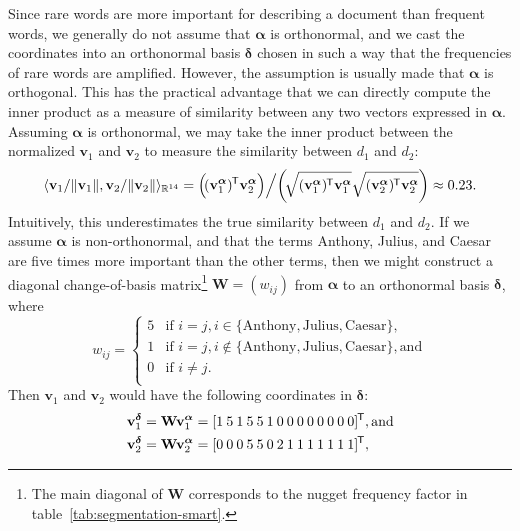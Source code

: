 \documentclass[
  digital, %
  notable, %
  lof,     %
  lot,     %
  nopalatino, color
]{fithesis3}
\newcommand*{\tran}{^{\mkern-1.5mu\mathsf{T}}}
\let\note=\footnote
\begin{document}
Since rare words are more important for describing a document than frequent
words, we generally do not assume that $\bm\alpha$ is orthonormal, and we
cast the coordinates into an orthonormal basis $\bm\delta$
chosen in such a way that the frequencies of rare words are amplified. However,
the assumption is usually made that $\bm\alpha$ is orthogonal. This has the
practical advantage that we can directly compute the inner product as a measure
of similarity between any two vectors expressed in $\bm\alpha$. Assuming
$\bm\alpha$ is orthonormal, we may take the inner product between the
normalized $\mathbf v_1$ and $\mathbf v_2$ to measure the similarity between
$d_1$ and $d_2$:
\begin{equation*}
  \langle\mathbf v_1/\Vert \mathbf v_1\Vert, \mathbf v_2/\Vert\mathbf
  v_2\Vert\rangle_{\mathbb{R}^{14}} = \Big(\!(\mathbf v_1^{\bm\alpha})\tran \mathbf v_2^{\bm\alpha}\Big) \Big/ \!
  \left(\!\sqrt{\mathbf (\mathbf v_1^{\bm\alpha})\tran \mathbf
  v_1^{\bm\alpha}}\sqrt{\mathbf (\mathbf v_2^{\bm\alpha})\tran \mathbf
  v_2^{\bm\alpha}}\right)\approx0.23.
\end{equation*}
Intuitively, this underestimates the true similarity between $d_1$ and $d_2$.
If we assume $\bm\alpha$ is non-orthonormal, and that the terms Anthony, Julius, and
Caesar are five times more important than the other terms, then we might construct
a diagonal change-of-basis matrix\note{%
The main diagonal of $\mathbf W$ corresponds to the
nugget frequency factor in table~\ref{tab:segmentation-smart}.} $\mathbf W =
(w_{ij})$ from $\bm\alpha$ to an orthonormal basis
$\bm\delta$, where
\begin{equation}
  \label{eq:similarity-W}
  w_{ij} = \begin{cases}
    5 & \text{if } i = j, i \in\{\textrm{Anthony}, \textrm{Julius}, \textrm{Caesar}\}, \\
    1 & \text{if } i = j, i \not\in\{\textrm{Anthony}, \textrm{Julius}, \textrm{Caesar}\}, \text{and} \\
    0 & \text{if } i \not= j. \\
  \end{cases}
\end{equation}
Then $\mathbf v_1$ and $\mathbf v_2$ would have the following coordinates in
$\bm\delta$:
\begin{align*}
  \mathbf v_1^{\bm\delta} &= \mathbf W \mathbf v_1^{\bm\alpha} = [1\:5\:1\:5\:5\:1\:0\:0\:0\:0\:0\:0\:0\:0]\tran, \text{and} \\
  \mathbf v_2^{\bm\delta} &= \mathbf W \mathbf v_2^{\bm\alpha} = [0\:0\:0\:5\:5\:0\:2\:1\:1\:1\:1\:1\:1\:1]\tran,
\end{align*}
\end{document}
